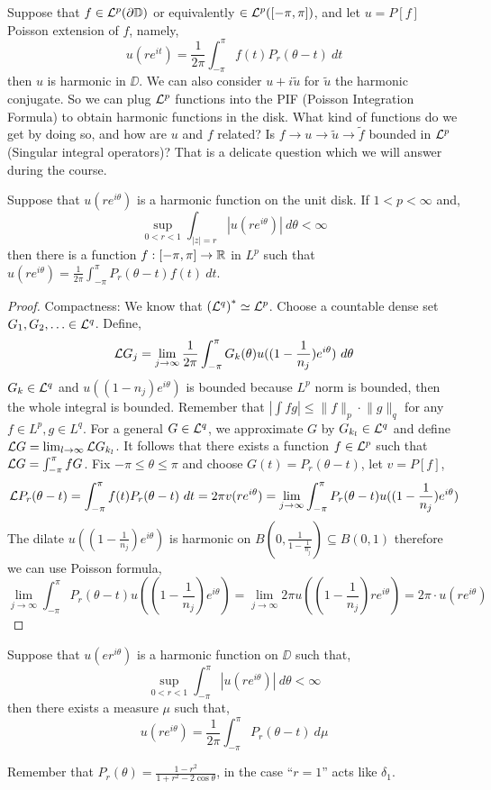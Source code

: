 Suppose that $f \in \mathcal{L}^p(\partial \mathbb{D})$ or equivalently $\in \mathcal{L}^p([-\pi, \pi])$, and let $u = P[f]$ Poisson extension of $f$, namely,
\[
	u(r e^{i t})
	= \frac{1}{2 \pi} \int_{- \pi}^{\pi} f(t) P_r(\theta - t)\ dt
\]
then $u$ is harmonic in $\DD$.
We can also consider $u + i \tilde{u}$ for $\tilde{u}$ the harmonic conjugate.
So we can plug $\mathcal{L}^p$ functions into the PIF (Poisson Integration Formula) to obtain harmonic functions in the disk.
What kind of functions do we get by doing so, and how are $u$ and $f$ related? Is $f \to u \to \tilde{u} \to \tilde{f}$ bounded in $\mathcal{L}^p$ (Singular integral operators)?
That is a delicate question which we will answer during the course.
\begin{theorem}
	Suppose that $u(r e^{i \theta})$ is a harmonic function on the unit disk. If $1 < p < \infty$ and,
	\[
		\sup_{0 < r < 1} \int_{|z| = r} {| u(r e^{i \theta}) |}\ d \theta < \infty
	\]
	then there is a function $f : [-\pi, \pi] \to \mathbb{R}$ in $L^p$ such that $u(r e^{i \theta}) = \frac{1}{2 \pi} \int_{- \pi}^{\pi} P_r(\theta - t) f(t)\ dt$.
\end{theorem}
\begin{proof}
	Compactness:
	We know that ${(\mathcal{L}^q)}^* \simeq \mathcal{L}^p$. Choose a countable dense set $G_1, G_2, \ldots \in \mathcal{L}^q$.
	Define,
	\[
		\mathcal{L} G_j
		= \lim_{j \to \infty} \frac{1}{2 \pi} \int_{- \pi}^{\pi} G_k(\theta) u((1 - \frac{1}{n_j}) e^{i \theta})\ d \theta
	\]
	$G_k \in \mathcal{L}^q$ and $u((1 - n_j) e^{i \theta})$ is bounded because $L^p$ norm is bounded, then the whole integral is bounded.
	Remember that $|\int f g| \le \lVert f \rVert_p \cdot \lVert g \rVert_q$ for any $f \in L^p, g \in L^q$.
	For a general $G \in \mathcal{L}^q$, we approximate $G$ by $G_{k_l} \in \mathcal{L}^q$ and define $\mathcal{L} G = \lim_{l \to \infty} \mathcal{L} G_{k_l}$.
	It follows that there exists a function $f \in \mathcal{L}^p$ such that $\mathcal{L} G = \int_{-\pi}^{\pi} f G$.
	Fix $-\pi \le \theta \le \pi$ and choose $G(t) = P_r(\theta - t)$, let $v = P[f]$,
	\[
		\mathcal{L} P_r(\theta - t)
		= \int_{-\pi}^{\pi} f(t) P_r(\theta - t)\ dt
		= 2 \pi v(r e^{i \theta})
		= \lim_{j \to \infty} \int_{-\pi}^{\pi} P_r(\theta - t) u((1 - \frac{1}{n_j}) e^{i \theta})
	\]
	The dilate $u((1 - \frac{1}{n_j}) e^{i \theta})$ is harmonic on $B(0, \frac{1}{1 - \frac{1}{n_j}}) \subseteq B(0, 1)$ therefore we can use Poisson formula,
	\[
		\lim_{j \to \infty} \int_{-\pi}^{\pi} P_r(\theta - t) u((1 - \frac{1}{n_j}) e^{i \theta})
		= \lim_{j \to \infty} 2 \pi u((1 - \frac{1}{n_j}) r e^{i \theta})
		= 2 \pi \cdot u(r e^{i \theta})
	\]
\end{proof}
\begin{theorem}
	Suppose that $u(e r^{i \theta})$ is a harmonic function on $\DD$ such that,
	\[
		\sup_{0 < r < 1} \int_{-\pi}^{\pi} |u(r e^{i \theta})|\ d \theta < \infty
	\]
	then there exists a measure $\mu$ such that,
	\[
		u(r e^{i \theta})
		= \frac{1}{2 \pi} \int_{-\pi}^{\pi} P_r(\theta - t)\ d \mu
	\]
\end{theorem}
\begin{example}
	Remember that $P_r(\theta) = \frac{1 - r^2}{1 + r^2 - 2 \cos \theta}$, in the case ``$r = 1$'' acts like $\delta_1$.
\end{example}

